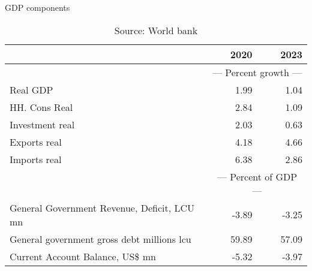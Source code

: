 \documentclass{article}
\begin{document}
\begin{table}[ht]
\caption{GDP components}
\begin{tabular}{lrr}
\toprule
 & 2020 & 2023 \\
\midrule
&\multicolumn{2}{c}{{---  Percent growth ---}}           \\
Real GDP & 1.99 & 1.04 \\
HH. Cons Real & 2.84 & 1.09 \\
Investment real & 2.03 & 0.63 \\
Exports real & 4.18 & 4.66 \\
Imports real & 6.38 & 2.86 \\
&\multicolumn{2}{c}{{---  Percent of GDP ---}}           \\
General Government Revenue, Deficit, LCU mn & -3.89 & -3.25 \\
General government gross debt millions lcu & 59.89 & 57.09 \\
Current Account Balance, US\$ mn & -5.32 & -3.97 \\
\bottomrule
\end{tabular}
\caption*{Source: World bank }
\end{table}
\end{document}
